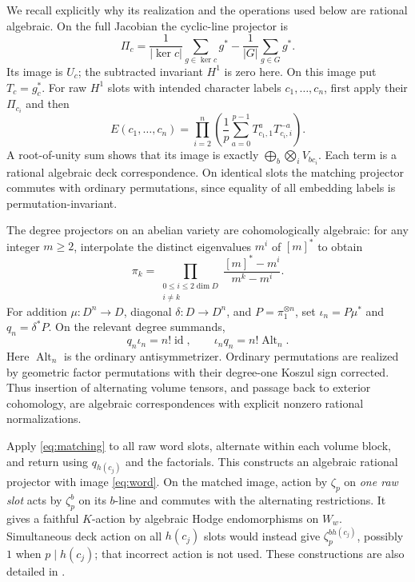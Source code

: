 \documentclass[11pt]{article}
\theoremstyle{definition}
\newcommand{\id}{\operatorname{id}}
\newcommand{\Alt}{\operatorname{Alt}}
\begin{document}
We recall explicitly why its realization and the operations used below
are rational algebraic. On the full Jacobian the cyclic-line projector is
\[
 \Pi_c=\frac1{|\ker c|}\sum_{g\in\ker c}g^*
       -\frac1{|G|}\sum_{g\in G}g^*.
\]
Its image is $U_c$; the subtracted invariant $H^1$ is zero here. On this
image put $T_c=g_c^*$. For raw $H^1$ slots with intended character
labels $c_1,\ldots,c_n$, first apply their $\Pi_{c_i}$ and then
\begin{equation}\label{eq:matching}
 E(c_1,\ldots,c_n)=
 \prod_{i=2}^n\left(\frac1p\sum_{a=0}^{p-1}
           T_{c_1,1}^aT_{c_i,i}^{-a}\right).
\end{equation}
A root-of-unity sum shows that its image is exactly
$\bigoplus_b\bigotimes_i V_{bc_i}$. Each term is a rational algebraic
deck correspondence. On identical slots the matching projector commutes
with ordinary permutations, since equality of all embedding labels is
permutation-invariant.

The degree projectors on an abelian variety are cohomologically algebraic:
for any integer $m\geq2$, interpolate the distinct eigenvalues $m^i$ of
$[m]^*$ to obtain
\[
 \pi_k=\prod_{\substack{0\leq i\leq2\dim D\\i\ne k}}
               \frac{[m]^*-m^i}{m^k-m^i}.
\]
For addition $\mu:D^n\to D$, diagonal $\delta:D\to D^n$, and
$P=\pi_1^{\otimes n}$, set $\iota_n=P\mu^*$ and $q_n=\delta^*P$.
On the relevant degree summands,
\[
 q_n\iota_n=n!\id,\qquad \iota_nq_n=n!\Alt_n.
\]
Here $\Alt_n$ is the ordinary antisymmetrizer. Ordinary permutations
are realized by geometric factor permutations with their degree-one Koszul
sign corrected. Thus insertion of alternating volume tensors, and passage
back to exterior cohomology, are algebraic correspondences with explicit
nonzero rational normalizations.

Apply \eqref{eq:matching} to all raw word slots, alternate within each
volume block, and return using $q_{h(c_j)}$ and the factorials. This
constructs an algebraic rational projector with image \eqref{eq:word}.
On the matched image, action by $\zeta_p$ on \emph{one raw slot} acts
by $\zeta_p^b$ on its $b$-line and commutes with the alternating
restrictions. It gives a faithful $K$-action by algebraic Hodge
endomorphisms on $W_w$. Simultaneous deck action on all $h(c_j)$ slots
would instead give $\zeta_p^{b h(c_j)}$, possibly $1$ when $p\mid h(c_j)$;
that incorrect action is not used. These constructions are also detailed
in \cite[Section~2]{Fusion}.
\end{document}
